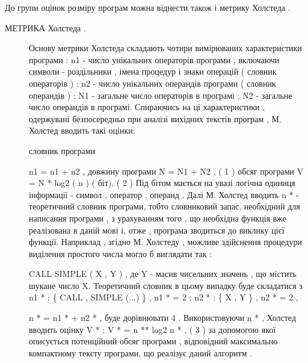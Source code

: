 \documentclass[oneside,final,14pt]{extreport}
\begin{document}
До групи оцінок розміру програм можна віднести також і метрику Холстеда .
\begin{description}
\item[{МЕТРИКА Холстеда .}] \leavevmode
Основу метрики Холстеда складають чотири вимірюваних характеристики програми :
n1 - число унікальних операторів програми , включаючи символи -
роздільники , імена процедур і знаки операцій ( словник операторів ) ;
n2 - число унікальних операндів програми ( словник операндів ) ;
N1 - загальне число операторів в програмі ;
N2 - загальне число операндів в програмі.
Спираючись на ці характеристики , одержувані безпосередньо при аналізі вихідних текстів програм , М. Холстед вводить такі оцінки:

словник програми

n1 = n1 + n2 ,
довжину програми
N = N1 + N2 , ( 1 )
обсяг програми
V = N * log2 ( n ) ( біт). ( 2 )
Під бітом мається на увазі логічна одиниця інформації - символ , оператор , операнд .
Далі М. Холстед вводить n * - теоретичний словник програми, тобто словниковий запас, необхідний для написання програми , з урахуванням того , що необхідна функція вже реалізована в даній мові і, отже , програма зводиться до виклику цієї функції. Наприклад , згідно М. Холстеду , можливе здійснення процедури виділення простого числа могло б виглядати так :

CALL SIMPLE ( X , Y ) ,
де Y - масив чисельних значень , що містить шукане число X.
Теоретичний словник в цьому випадку буде складатися з
n1 * : \{ CALL , SIMPLE (...) \} ,
n1 * = 2 ; n2 * : \{ X , Y \} ,
n2 * = 2 ,

n * = n1 * + n2 * ,
буде дорівнювати 4 .
Використовуючи n * , Холстед вводить оцінку V * :
V * = n ** log2 n * , ( 3 )
за допомогою якої описується потенційний обсяг програми , відповідний максимально компактному тексту програми, що реалізує даний алгоритм .

\end{description}
\end{document}
